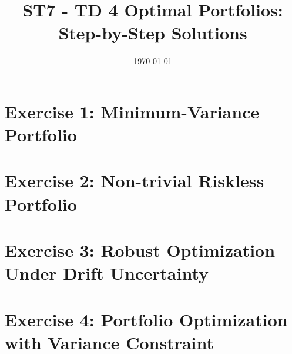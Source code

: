 \documentclass{article}
\begin{document}
\title{ST7 - TD 4 Optimal Portfolios: Step-by-Step Solutions}
\author{}
\date{\today}

\maketitle

\tableofcontents
\newpage


\section{Exercise 1: Minimum-Variance Portfolio}


\newpage
\section{Exercise 2: Non-trivial Riskless Portfolio}


\newpage
\section{Exercise 3: Robust Optimization Under Drift Uncertainty}


\newpage
\section{Exercise 4: Portfolio Optimization with Variance Constraint}

\end{document}
